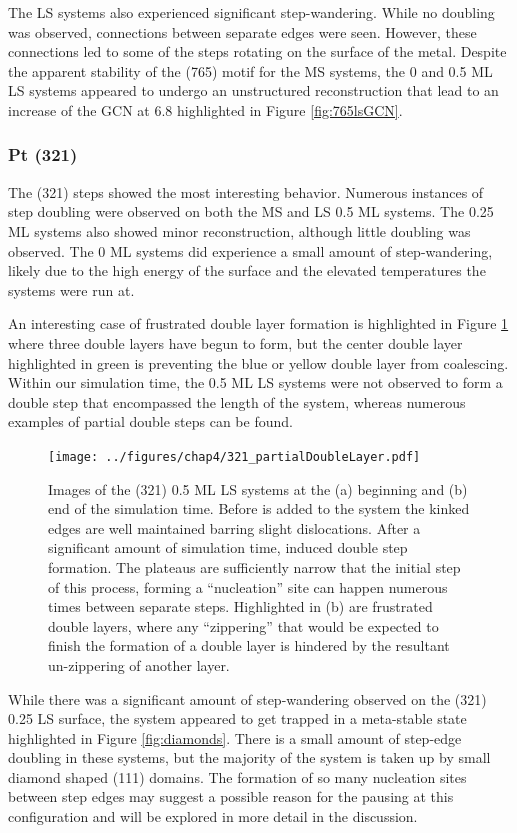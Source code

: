 The LS systems also experienced significant step-wandering. While no doubling
was observed, connections between separate edges were seen. However, these
connections led to some of the steps rotating on the surface of the metal.
Despite the apparent stability of the (765) motif for the MS systems, the 0 and
0.5 ML LS systems appeared to undergo an unstructured reconstruction that lead
to an increase of the GCN at 6.8 highlighted in Figure \ref{fig:765lsGCN}.

\subsubsection{Pt (321)}
The (321) steps showed the most interesting behavior. Numerous instances of
step doubling were observed on both the MS and LS 0.5 ML systems. The 0.25 ML
systems also showed minor reconstruction, although little doubling
was observed. The 0 ML systems did experience a small amount of step-wandering,
likely due to the high energy of the surface and the elevated temperatures the
systems were run at.

An interesting case of frustrated double layer formation is highlighted in
Figure \ref{fig:partialDoubleLayer} where three double layers have begun to
form, but the center double layer highlighted in green is preventing the blue
or yellow double layer from coalescing. Within our simulation time, the 0.5 ML
LS systems were not observed to form a double step that encompassed the length
of the system, whereas numerous examples of partial double steps can be found.

\begin{figure}
\centering
\texttt{[image: ../figures/chap4/321\_partialDoubleLayer.pdf]}
\caption{Images of the (321) 0.5 ML LS systems at the (a) beginning and
(b) end of the simulation time. Before  is added to the system the
kinked edges are well maintained barring slight dislocations. After a
significant amount of simulation time,  induced double step formation.
The plateaus are sufficiently narrow that the initial step of this process, forming a
``nucleation'' site can happen numerous times between separate steps.
Highlighted in (b) are frustrated double layers, where any ``zippering'' that
would be expected to finish the formation of a double layer is hindered by the
resultant un-zippering of another layer.}
\label{fig:partialDoubleLayer}
\end{figure}

While there was a significant amount of step-wandering observed on the (321)
0.25 LS surface, the system appeared to get trapped in a meta-stable state
highlighted in Figure \ref{fig:diamonds}. There is a small amount of step-edge
doubling in these systems, but the majority of the system is taken up by small
diamond shaped (111) domains. The formation of so many nucleation sites between
step edges may suggest a possible reason for the pausing at this configuration
and will be explored in more detail in the discussion.

